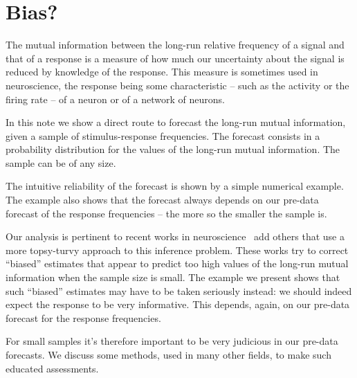 \documentclass[\ifafour a4paper,12pt,\else a5paper,10pt,\fi%
onecolumn,oneside,article,%
british%
]{memoir}
\theoremstyle{remark}
\theoremstyle{innote}
\newcommand*{\citep}{\parencites}
\renewcommand*{\|}{\nonscript\,\vert\nonscript\;\mathopen{}}
\newcommand*{\puzzle}{{\fontencoding{U}\fontfamily{fontawesometwo}\selectfont\symbol{225}}}
\newcommand{\mynote}[1]{ {\color{notecolour}\puzzle\ #1}}
\begin{document}
\section{Bias?}
\label{sec:intro}

The mutual information between the long-run relative frequency of a signal
and that of a response is a measure of how much our uncertainty about the
signal is reduced by knowledge of the response. This measure is sometimes
used in neuroscience, the response being some characteristic -- such as the
activity or the firing rate -- of a neuron or of a network of neurons.

In this note we show a direct route to forecast the long-run mutual
information, given a sample of stimulus-response frequencies. The forecast
consists in a probability distribution for the values of the long-run
mutual information. The sample can be of any size.

The intuitive reliability of the forecast is shown by a simple numerical
example. The example also shows that the forecast always depends on our pre-data
forecast of the response frequencies -- the more so the smaller the sample
is.

Our analysis is pertinent to recent works in neuroscience
\citep{panzerietal2007}\mynote{add others} that use a more topsy-turvy
approach to this inference problem. These works try to correct
\enquote{biased} estimates that appear to predict too high values of the
long-run mutual information when the sample size is small. The example we
present shows that such \enquote{biased} estimates may have to be taken
seriously instead: we should indeed expect the response to be very
informative. This depends, again, on our pre-data forecast for the response
frequencies.

For small samples it's therefore important to be very judicious in our
pre-data forecasts. We discuss some methods, used in many other fields, to
make such educated assessments.

\end{document}
